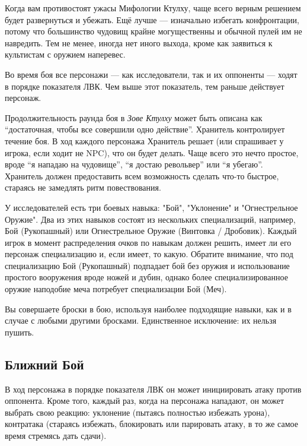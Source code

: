 \documentclass[letterpaper,twocolumn,openany, twoside, 11pt, usenames]{cocbook}
\begin{document}
Когда вам противостоят ужасы Мифологии Ктулху, чаще всего верным решением будет развернуться и убежать. Ещё лучше --- изначально избегать конфронтации, потому что большинство чудовищ крайне могущественны и обычной пулей им не навредить. Тем не менее, иногда нет иного выхода, кроме как заявиться к культистам с оружием наперевес.

Во время боя все персонажи --- как исследователи, так и их оппоненты --- ходят в порядке показателя ЛВК. Чем выше этот показатель, тем раньше действует персонаж.

\smallbreak
\noindent {}

Продолжительность раунда боя в {\it Зове Ктулху} может быть описана как ``достаточная, чтобы все совершили одно действие''. Хранитель контролирует течение боя. В ход каждого персонажа Хранитель решает (или спрашивает у игрока, если ходит не NPC), что он будет делать. Чаще всего это нечто простое, вроде ``я нападаю на чудовище'', ``я достаю револьвер'' или ``я убегаю''. Хранитель должен предоставить всем возможность сделать что-то быстрое, стараясь не замедлять ритм повествования.

У исследователей есть три боевых навыка: "Бой", "Уклонение" и "Огнестрельное Оружие". Два из этих навыков состоят из нескольких специализаций, например, Бой (Рукопашный) или Огнестрельное Оружие (Винтовка / Дробовик). Каждый игрок в момент распределения очков по навыкам должен решить, имеет ли его персонаж специализацию и, если имеет, то какую. Обратите внимание, что под специализацию Бой (Рукопашный) подпадает бой без оружия и использование простого вооружения вроде ножей и дубин, однако более специализированное оружие наподобие меча потребует специализации Бой (Меч).

Вы совершаете броски в бою, используя наиболее подходящие навыки, как и в случае с любыми другими бросками. Единственное исключение: их нельзя пушить.

\subsection*{Ближний Бой}

В ход персонажа в порядке показателя ЛВК он может инициировать атаку против оппонента. Кроме того, каждый раз, когда на персонажа нападают, он может выбрать свою реакцию: уклонение (пытаясь полностью избежать урона), контратака (стараясь избежать, блокировать или парировать атаку, в то же самое время стремясь дать сдачи).
\end{document}
